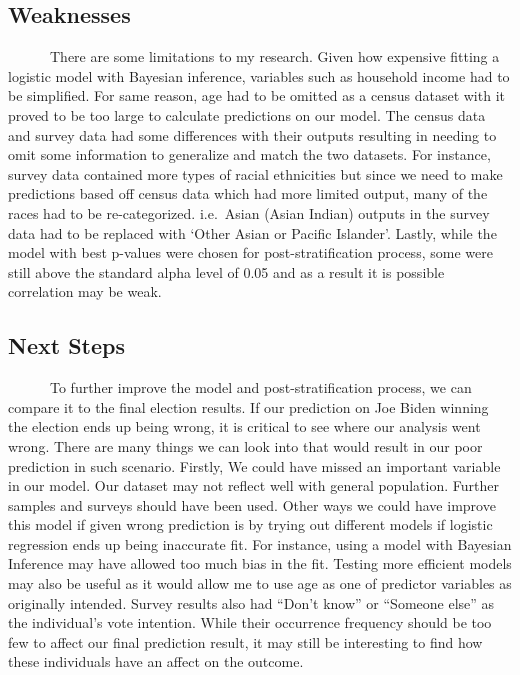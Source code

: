 \documentclass[
]{article}
\begin{document}
\hypertarget{weaknesses}{%
\subsection{Weaknesses}\label{weaknesses}}

~~~~~~There are some limitations to my research. Given how expensive
fitting a logistic model with Bayesian inference, variables such as
household income had to be simplified. For same reason, age had to be
omitted as a census dataset with it proved to be too large to calculate
predictions on our model. The census data and survey data had some
differences with their outputs resulting in needing to omit some
information to generalize and match the two datasets. For instance,
survey data contained more types of racial ethnicities but since we need
to make predictions based off census data which had more limited output,
many of the races had to be re-categorized. i.e.~Asian (Asian Indian)
outputs in the survey data had to be replaced with `Other Asian or
Pacific Islander'. Lastly, while the model with best p-values were
chosen for post-stratification process, some were still above the
standard alpha level of 0.05 and as a result it is possible correlation
may be weak.

\hypertarget{next-steps}{%
\subsection{Next Steps}\label{next-steps}}

~~~~~~To further improve the model and post-stratification process, we
can compare it to the final election results. If our prediction on Joe
Biden winning the election ends up being wrong, it is critical to see
where our analysis went wrong. There are many things we can look into
that would result in our poor prediction in such scenario. Firstly, We
could have missed an important variable in our model. Our dataset may
not reflect well with general population. Further samples and surveys
should have been used. Other ways we could have improve this model if
given wrong prediction is by trying out different models if logistic
regression ends up being inaccurate fit. For instance, using a model
with Bayesian Inference may have allowed too much bias in the fit.
Testing more efficient models may also be useful as it would allow me to
use age as one of predictor variables as originally intended. Survey
results also had ``Don't know'' or ``Someone else'' as the individual's
vote intention. While their occurrence frequency should be too few to
affect our final prediction result, it may still be interesting to find
how these individuals have an affect on the outcome.
\end{document}

